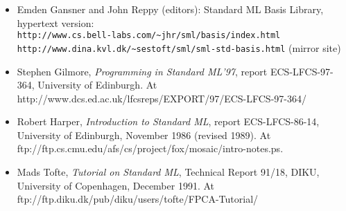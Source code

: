 \documentclass[fleqn]{article}
\begin{document}
\begin{itemize}
\item Emden Gansner and John Reppy (editors): Standard ML Basis
  Library, hypertext version:\\ 
  \verb#http://www.cs.bell-labs.com/~jhr/sml/basis/index.html# \\
  \verb#http://www.dina.kvl.dk/~sestoft/sml/sml-std-basis.html#
  (mirror site)
  
\item Stephen Gilmore, \emph{Programming in Standard ML'97}, report
  ECS-LFCS-97-364, University of Edinburgh.  At
  http://www.dcs.ed.ac.uk/lfcsreps/EXPORT/97/ECS-LFCS-97-364/
  
\item Robert Harper, {\em Introduction to Standard ML\/}, report
  ECS-LFCS-86-14, University of Edinburgh, November 1986 (revised
  1989).  At
  ftp://ftp.cs.cmu.edu/afs/cs/project/fox/mosaic/intro-notes.ps.

\item Mads Tofte, {\em Tutorial on Standard ML\/}, Technical Report
  91/18, DIKU, University of Copenhagen, December 1991.  At 
  ftp://ftp.diku.dk/pub/diku/users/tofte/FPCA-Tutorial/
\end{itemize}



\end{document}

